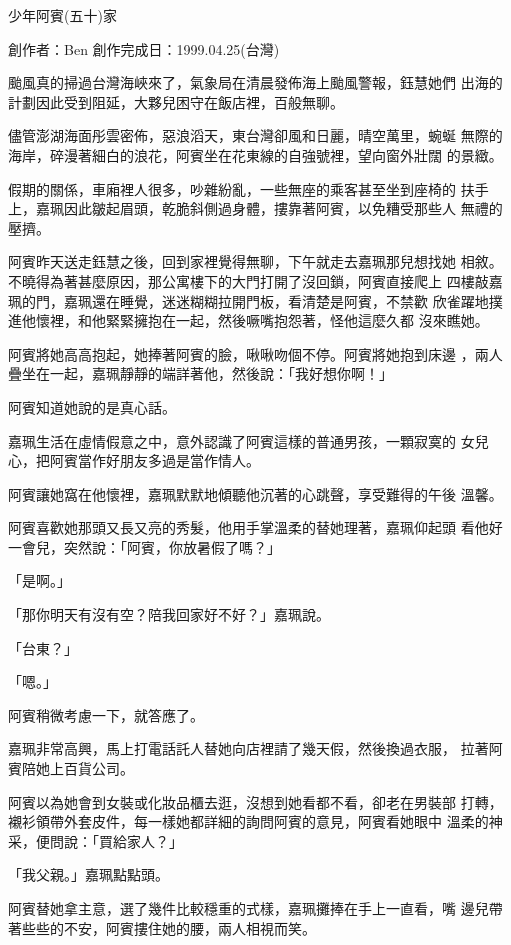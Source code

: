 



少年阿賓(五十)家

創作者：Ben
創作完成日：1999.04.25(台灣)


颱風真的掃過台灣海峽來了，氣象局在清晨發佈海上颱風警報，鈺慧她們
出海的計劃因此受到阻延，大夥兒困守在飯店裡，百般無聊。

儘管澎湖海面彤雲密佈，惡浪滔天，東台灣卻風和日麗，晴空萬里，蜿蜒
無際的海岸，碎漫著細白的浪花，阿賓坐在花東線的自強號裡，望向窗外壯闊
的景緻。

假期的關係，車廂裡人很多，吵雜紛亂，一些無座的乘客甚至坐到座椅的
扶手上，嘉珮因此皺起眉頭，乾脆斜側過身體，摟靠著阿賓，以免糟受那些人
無禮的壓擠。

阿賓昨天送走鈺慧之後，回到家裡覺得無聊，下午就走去嘉珮那兒想找她
相敘。不曉得為著甚麼原因，那公寓樓下的大門打開了沒回鎖，阿賓直接爬上
四樓敲嘉珮的門，嘉珮還在睡覺，迷迷糊糊拉開門板，看清楚是阿賓，不禁歡
欣雀躍地撲進他懷裡，和他緊緊擁抱在一起，然後噘嘴抱怨著，怪他這麼久都
沒來瞧她。

阿賓將她高高抱起，她捧著阿賓的臉，啾啾吻個不停。阿賓將她抱到床邊
，兩人疊坐在一起，嘉珮靜靜的端詳著他，然後說：「我好想你啊！」

阿賓知道她說的是真心話。

嘉珮生活在虛情假意之中，意外認識了阿賓這樣的普通男孩，一顆寂寞的
女兒心，把阿賓當作好朋友多過是當作情人。

阿賓讓她窩在他懷裡，嘉珮默默地傾聽他沉著的心跳聲，享受難得的午後
溫馨。

阿賓喜歡她那頭又長又亮的秀髮，他用手掌溫柔的替她理著，嘉珮仰起頭
看他好一會兒，突然說：「阿賓，你放暑假了嗎？」

「是啊。」

「那你明天有沒有空？陪我回家好不好？」嘉珮說。

「台東？」

「嗯。」

阿賓稍微考慮一下，就答應了。

嘉珮非常高興，馬上打電話託人替她向店裡請了幾天假，然後換過衣服，
拉著阿賓陪她上百貨公司。

阿賓以為她會到女裝或化妝品櫃去逛，沒想到她看都不看，卻老在男裝部
打轉，襯衫領帶外套皮件，每一樣她都詳細的詢問阿賓的意見，阿賓看她眼中
溫柔的神采，便問說：「買給家人？」

「我父親。」嘉珮點點頭。

阿賓替她拿主意，選了幾件比較穩重的式樣，嘉珮攤捧在手上一直看，嘴
邊兒帶著些些的不安，阿賓摟住她的腰，兩人相視而笑。

